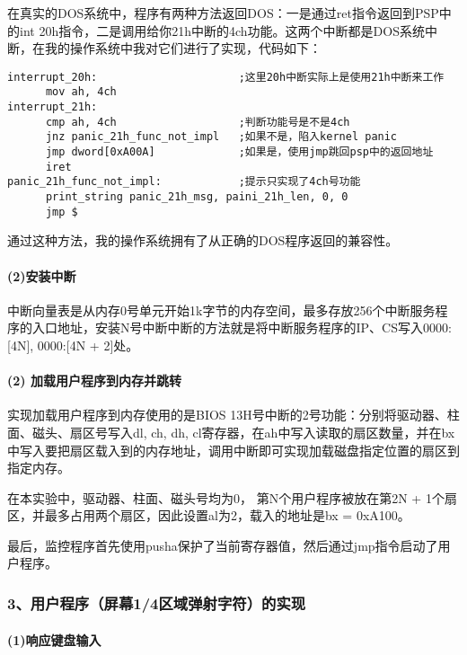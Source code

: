 \documentclass[ctexart]{article}
\let\oldparagraph\paragraph
\renewcommand{\paragraph}[1]{\oldparagraph{#1}\mbox{}}
\begin{document}
在真实的DOS系统中，程序有两种方法返回DOS：一是通过ret指令返回到PSP中的int
20h指令，二是调用给你21h中断的4ch功能。这两个中断都是DOS系统中断，在我的操作系统中我对它们进行了实现，代码如下：

\begin{verbatim}
interrupt_20h:						;这里20h中断实际上是使用21h中断来工作
      mov ah, 4ch
interrupt_21h:
      cmp ah, 4ch					;判断功能号是不是4ch
      jnz panic_21h_func_not_impl	;如果不是，陷入kernel panic
      jmp dword[0xA00A]				;如果是，使用jmp跳回psp中的返回地址
      iret
panic_21h_func_not_impl:			;提示只实现了4ch号功能
      print_string panic_21h_msg, paini_21h_len, 0, 0
      jmp $
\end{verbatim}

通过这种方法，我的操作系统拥有了从正确的DOS程序返回的兼容性。

\hypertarget{header-n472}{%
\paragraph{(2)安装中断}\label{header-n472}}

中断向量表是从内存0号单元开始1k字节的内存空间，最多存放256个中断服务程序的入口地址，安装N号中断中断的方法就是将中断服务程序的IP、CS写入0000:{[}4N{]},
0000:{[}4N + 2{]}处。

\hypertarget{header-n405}{%
\paragraph{(2) 加载用户程序到内存并跳转}\label{header-n405}}

实现加载用户程序到内存使用的是BIOS
13H号中断的2号功能：分别将驱动器、柱面、磁头、扇区号写入dl, ch, dh,
cl寄存器，在ah中写入读取的扇区数量，并在bx中写入要把扇区载入到的内存地址，调用中断即可实现加载磁盘指定位置的扇区到指定内存。

在本实验中，驱动器、柱面、磁头号均为0， 第N个用户程序被放在第2N +
1个扇区，并最多占用两个扇区，因此设置al为2，载入的地址是bx = 0xA100。

最后，监控程序首先使用pusha保护了当前寄存器值，然后通过jmp指令启动了用户程序。

\hypertarget{header-n314}{%
\subsubsection{3、用户程序（屏幕1/4区域弹射字符）的实现}\label{header-n314}}

\hypertarget{header-n439}{%
\paragraph{(1)响应键盘输入}\label{header-n439}}
\end{document}
